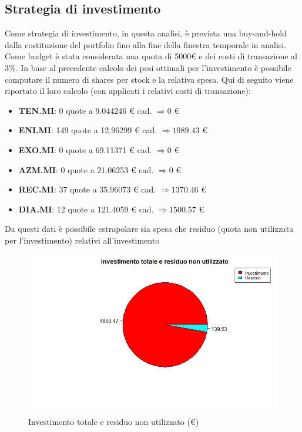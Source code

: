 \documentclass[12pt]{article}
\begin{document}
\subsection{Strategia di investimento}
Come strategia di investimento, in questa analisi, è prevista una buy-and-hold dalla costituzione del portfolio fino alla fine della finestra temporale in analisi. Come budget è stata considerata una quota di 5000€ e dei costi di transazione al $3\%$.
In base al precedente calcolo dei pesi ottimali per l'investimento è possibile computare il numero di shares per stock e la relativa spesa. Qui di seguito viene riportato il loro calcolo (con applicati i relativi costi di transazione):
\begin{itemize}
    \item \textbf{TEN.MI}: 0 quote a 9.044246 € cad. $\Rightarrow 0$ €
    \item \textbf{ENI.MI}: 149 quote a 12.96299 € cad. $\Rightarrow 1989.43$ €
    \item \textbf{EXO.MI}: 0 quote a 69.11371 € cad. $\Rightarrow 0$ €
    \item \textbf{AZM.MI}: 0 quote a 21.06253 € cad. $\Rightarrow 0$ €
    \item \textbf{REC.MI}: 37 quote a 35.96073 € cad. $\Rightarrow 1370.46$ €
    \item \textbf{DIA.MI}: 12 quote a 121.4059 € cad. $\Rightarrow 1500.57$ €
\end{itemize}
Da questi dati è possibile estrapolare sia spesa che residuo (quota non utilizzata per l'investimento) relativi all'investimento
\begin{figure}[!htb]
    \centering
    \includegraphics[width=1\textwidth]{immagini/invres.png}
    \caption{Investimento totale e residuo non utilizzato (€)}
\end{figure}
\end{document}

